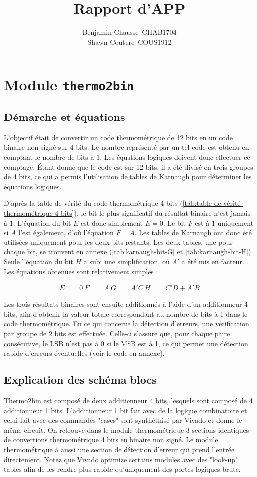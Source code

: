 \documentclass[a11paper]{article}
\title{Rapport d'APP}
\author{
  \addtolength{\tabcolsep}{-0.4em}
  \begin{tabular}{rcl} %
      Benjamin Chausse & -- & CHAB1704 \\
      Shawn Couture    & -- & COUS1912 \\
  \end{tabular}
}
\begin{document}
\maketitle
\newpage
\tableofcontents
\newpage

\section{Module \texttt{thermo2bin}}
\subsection{Démarche et équations}

L’objectif était de convertir un code thermométrique de 12 bits en un code
binaire non signé sur 4 bits. Le nombre représenté par un tel code est obtenu
en comptant le nombre de bits à 1. Les équations logiques doivent donc
effectuer ce comptage. Étant donné que le code est sur 12 bits, il a été
divisé en trois groupes de 4 bits, ce qui a permis l'utilisation de tables de
Karnaugh pour déterminer les équations logiques.

D'après la table de vérité du code thermométrique 4 bits
(\ref{tab:table-de-vérité-thermométrique-4-bits}), le bit le plus
significatif du résultat binaire n’est jamais à 1. L'équation du bit $E$ est
donc simplement $E = 0$. Le bit $F$ est à 1 uniquement si $A$ l’est
également, d’où l’équation $F = A$. Les tables de Karnaugh ont donc été
utilisées uniquement pour les deux bits restants. Les deux tables, une pour
chaque bit, se trouvent en annexe (\ref{tab:karnaugh-bit-G} et
\ref{tab:karnaugh-bit-H}). Seule l'équation du bit $H$ a subi une
simplification, où $A'$ a été mis en facteur. Les équations obtenues sont
relativement simples :

\begin{align}
	E & = 0 \
	F & = A \
	G & = A'C \
	H & = C'D + A'B
\end{align}

Les trois résultats binaires sont ensuite additionnés à l’aide d’un
additionneur 4 bits, afin d’obtenir la valeur totale correspondant au nombre
de bits à 1 dans le code thermométrique. En ce qui concerne la détection
d'erreurs, une vérification par groupe de 2 bits est effectuée. Celle-ci
s’assure que, pour chaque paire consécutive, le LSB n’est pas à 0 si le MSB
est à 1, ce qui permet une détection rapide d’erreurs éventuelles (voir le
code en annexe).

\subsection{Explication des schéma blocs}
Thermo2bin est composé de deux additionneur 4 bits, lesquels sont composé de 4 additionneur 1 bits. L'additionneur 1 bit fait avec de la
logique combinatoire et celui fait avec des commandes "cases" sont synthéthisé par Vivado et donne le même circuit. On retrouve dans le
module thermométrique 3 sections identiques de convertions thermométrique 4 bits en binaire non signé. Le module thermométrique à aussi
une section de détection d'erreur qui prend l'entrée directement. Notez que Vivado optimize certains modules avec des "look-up" tables
afin de les rendre plus rapide qu'uniquement des portes logiques brute.
\end{document}

